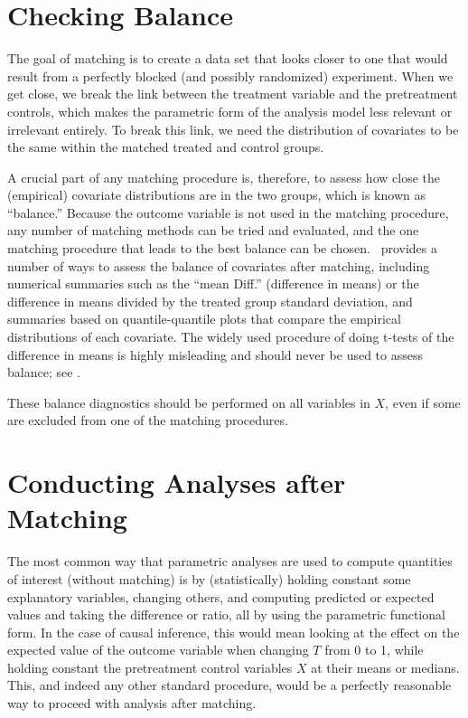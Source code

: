 \section{Checking Balance}
\label{sec:balance-sum}

The goal of matching is to create a data set that looks closer to one
that would result from a perfectly blocked (and possibly randomized)
experiment.  When we get close, we break the link between the treatment
variable and the pretreatment controls, which makes the parametric
form of the analysis model less relevant or irrelevant entirely.  To
break this link, we need the distribution of covariates to be the same
within the matched treated and control groups.

A crucial part of any matching procedure is, therefore, to assess how
close the (empirical) covariate distributions are in the two groups,
which is known as ``balance.''  Because the outcome variable is not
used in the matching procedure, any number of matching methods can be
tried and evaluated, and the one matching procedure that leads to the
best balance can be chosen.  \MatchIt\ provides a number of ways to
assess the balance of covariates after matching, including numerical
summaries such as the ``mean Diff.'' (difference in means) or the
difference in means divided by the treated group standard deviation,
and summaries based on quantile-quantile plots that compare the
empirical distributions of each covariate.  The widely used procedure
of doing t-tests of the difference in means is highly misleading and
should never be used to assess balance; see \citet{ImaKinStu07}.

These balance diagnostics should be performed on all variables in $X$,
even if some are excluded from one of the matching procedures.

\section{Conducting Analyses after Matching}

The most common way that parametric analyses are used to compute
quantities of interest (without matching) is by (statistically) holding
constant some explanatory variables, changing others, and computing
predicted or expected values and taking the difference or ratio, all
by using the parametric functional form.  In the case of causal
inference, this would mean looking at the effect on the expected value
of the outcome variable when changing $T$ from 0 to 1, while holding
constant the pretreatment control variables $X$ at their means or
medians.  This, and indeed any other standard procedure, would be a
perfectly reasonable way to proceed with analysis after matching.

